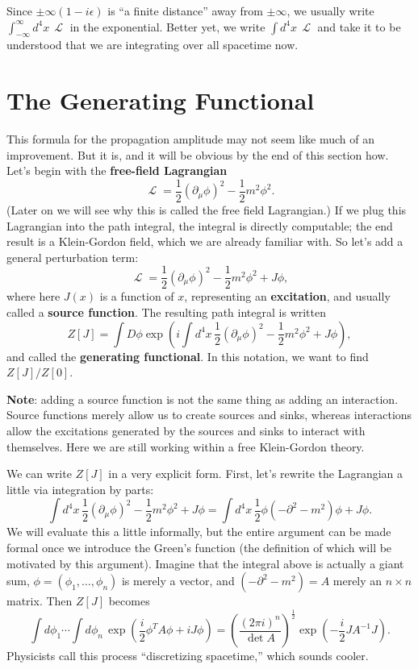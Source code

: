 \documentclass{report}
\theoremstyle{plain}
\theoremstyle{definition}
\theoremstyle{remark}
\DeclareMathOperator{\cL}{\mathcal{L}}
\begin{document}
Since $\pm \infty(1 - i\epsilon)$ is ``a finite distance'' away from
$\pm \infty$, we usually write $\int_{-\infty}^\infty d^4x \, \cL$ in
the exponential. Better yet, we write $\int d^4x \, \cL$ and take it
to be understood that we are integrating over all spacetime now.

\section{The Generating Functional}

This formula for the propagation amplitude may not seem like much of
an improvement. But it is, and it will be obvious by the end of this
section how. Let's begin with the {\bf free-field Lagrangian}
$$ \cL = \frac{1}{2} (\partial_\mu \phi)^2 - \frac{1}{2} m^2\phi^2. $$
(Later on we will see why this is called the free field Lagrangian.)
If we plug this Lagrangian into the path integral, the integral is
directly computable; the end result is a Klein-Gordon field, which we
are already familiar with. So let's add a general perturbation term:
$$ \cL = \frac{1}{2} (\partial_\mu\phi)^2 - \frac{1}{2} m^2\phi^2 + J\phi, $$
where here $J(x)$ is a function of $x$, representing an {\bf
  excitation}, and usually called a {\bf source function}. The
resulting path integral is written
$$ Z[J] = \int D\phi \exp\left(i \int d^4x \, \frac{1}{2} (\partial_\mu \phi)^2 - \frac{1}{2}m^2\phi^2 + J\phi\right), $$
and called the {\bf generating functional}. In this notation, we want
to find $Z[J]/Z[0]$.

{\bf Note}: adding a source function is not the same thing as adding
an interaction. Source functions merely allow us to create sources and
sinks, whereas interactions allow the excitations generated by the
sources and sinks to interact with themselves. Here we are still
working within a free Klein-Gordon theory.

We can write $Z[J]$ in a very explicit form. First, let's rewrite the
Lagrangian a little via integration by parts:
$$ \int d^4x \, \frac{1}{2} (\partial_\mu \phi)^2 - \frac{1}{2} m^2\phi^2 + J\phi = \int d^4x \, \frac{1}{2} \phi(-\partial^2 - m^2)\phi + J\phi. $$
We will evaluate this a little informally, but the entire argument can
be made formal once we introduce the Green's function (the definition
of which will be motivated by this argument). Imagine that the
integral above is actually a giant sum,
$\phi = (\phi_1, \ldots, \phi_n)$ is merely a vector, and
$(-\partial^2 - m^2) = A$ merely an $n \times n$ matrix. Then $Z[J]$
becomes
$$ \int d\phi_1 \cdots \int d\phi_n \, \exp\left(\frac{i}{2} \phi^T A \phi + iJ\phi\right) = \left(\frac{(2\pi i)^n}{\det A}\right)^{\frac{1}{2}} \exp\left(-\frac{i}{2} JA^{-1}J\right). $$
Physicists call this process ``discretizing spacetime,'' which sounds
cooler.
\end{document}
